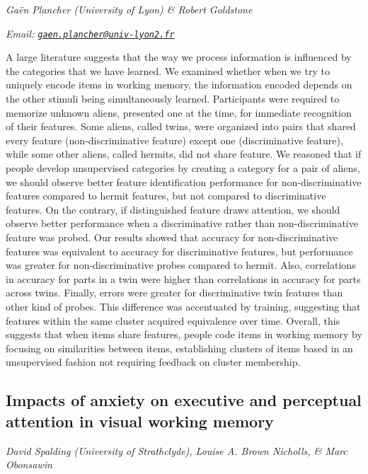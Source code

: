 \documentclass[
  12pt,
]{book}
\begin{document}
\emph{Gaën Plancher (University of Lyon) \& Robert Goldstone}

\emph{Email: \href{mailto:gaen.plancher@univ-lyon2.fr}{\nolinkurl{gaen.plancher@univ-lyon2.fr}}}

A large literature suggests that the way we process information is influenced by the categories that we have learned. We examined whether when we try to uniquely encode items in working memory, the information encoded depends on the other stimuli being simultaneously learned. Participants were required to memorize unknown aliens, presented one at the time, for immediate recognition of their features. Some aliens, called twins, were organized into pairs that shared every feature (non-discriminative feature) except one (discriminative feature), while some other aliens, called hermits, did not share feature. We reasoned that if people develop unsupervised categories by creating a category for a pair of aliens, we should observe better feature identification performance for non-discriminative features compared to hermit features, but not compared to discriminative features. On the contrary, if distinguished feature draws attention, we should observe better performance when a discriminative rather than non-discriminative feature was probed. Our results showed that accuracy for non-discriminative features was equivalent to accuracy for discriminative features, but performance was greater for non-discriminative probes compared to hermit. Also, correlations in accuracy for parts in a twin were higher than correlations in accuracy for parts across twins. Finally, errors were greater for discriminative twin features than other kind of probes. This difference was accentuated by training, suggesting that features within the same cluster acquired equivalence over time. Overall, this suggests that when items share features, people code items in working memory by focusing on similarities between items, establishing clusters of items based in an unsupervised fashion not requiring feedback on cluster membership.

\hypertarget{impacts-of-anxiety-on-executive-and-perceptual-attention-in-visual-working-memory}{%
\subsection{Impacts of anxiety on executive and perceptual attention in visual working memory}\label{impacts-of-anxiety-on-executive-and-perceptual-attention-in-visual-working-memory}}

\emph{David Spalding (University of Strathclyde), Louise A. Brown Nicholls, \& Marc Obonsawin}
\end{document}
